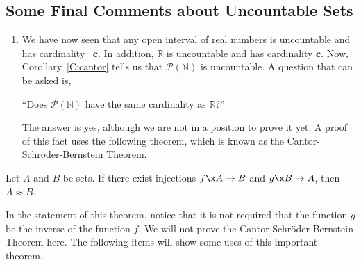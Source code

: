 \subsection*{Some Final Comments about Uncountable Sets}
\begin{enumerate}
\item We have now seen that any open interval of real numbers is uncountable and has cardinality \
$\boldsymbol{c}$.  In addition, $\mathbb{R}$ is uncountable and has cardinality $\boldsymbol{c}$.  Now, Corollary~\ref{C:cantor} tells us that $\mathcal{P} ( \mathbb{N} )$ is uncountable.  A question that can be asked is, 
\begin{center}
``Does $\mathcal{P} ( \mathbb{N} )$ have the same cardinality as $\mathbb{R}$?''
\end{center}
The answer is yes, although we are not in a position to prove it yet.  A proof of this fact uses the following theorem, which is known as the Cantor-Schr\"{o}der-Bernstein Theorem.
\label{sec94:comment1}%
\end{enumerate}

\begin{theorem}\label{T:bernstein}
Let $A$ and $B$ be sets.  If there exist injections $f\x A \to B$ and $g\x B \to A$, then 
$A \approx B$.
\end{theorem}
%


In the statement of this theorem, notice that it is not required that the function $g$ be the inverse of the function $f$.  We will not prove the Cantor-Schr\"{o}der-Bernstein Theorem here.  
The following items will show some uses of this important theorem. 


